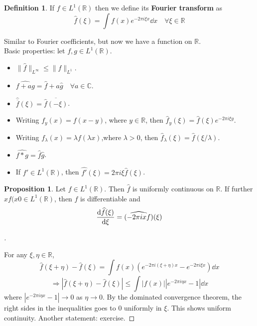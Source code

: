 \documentclass{article}
\theoremstyle{definition}
\newtheorem{dfn}{Definition}
\newtheorem{prop}{Proposition}
\newenvironment{proofs}[1][\proofname]{%
  \begin{proof}[#1]$ $\par\nobreak\ignorespaces
}{%
  \end{proof}
}
\newcommand{\CC}{\mathbb C}
\newcommand{\RR}{\mathbb R}
\newcommand{\Ra}{\Rightarrow}
\begin{document}
\begin{dfn}
	If $f \in L^1(\RR)$ then we define its \textbf{Fourier transform} as
	\[
		\widehat{f}(\xi) = \int f(x) e^{- 2 \pi i \xi x} \dd{x} \quad \forall \xi \in \RR
	\]
\end{dfn}

Similar to Fourier coefficients, but now we have a function on $\RR$.\\
Basic properties: let $f, g \in L^1(\RR)$.
\begin{itemize}
	\item $\|\widehat{f}\|_{L^\infty} \leq \|f\|_{L^1}$.	

	\item $\widehat{f + ag} = \widehat{f} + a \widehat{g} \quad \forall a \in \CC$.

	\item $\widehat{\overline{f}}(\xi) = \overline{\widehat{f}(- \xi)}$.

	\item Writing $f_y(x) = f(x - y)$, where $y \in \RR$, then $\widehat{f}_y (\xi) = \widehat{f}(\xi) e^{- 2 \pi i \xi y}$.

	\item Writing $f_\lambda(x) = \lambda f(\lambda x)$,where $\lambda > 0$, then $\widehat{f}_\lambda(\xi) = \widehat{f}(\xi/\lambda)$.

	\item $\widehat{f * g} = \widehat{f} \widehat{g}$.

	\item If $f' \in L^1(\RR)$, then $\widehat{f'}(\xi) = 2 \pi i \xi \widehat{f}(\xi)$.
\end{itemize}

\begin{prop}
	Let $f \in L^1(\RR)$.
	Then $\widehat{f}$ is uniformly continuous on $\RR$.
	If further $x f(x0 \in L^1(\RR)$, then $\widehat{f}$ is differentiable and 
	\[
		\dv{\widehat{f}(\xi)}{\xi} = \widehat{(- 2 \pi i x f)} (\xi)
	\]
\end{prop}

\begin{proofs}
	For any $\xi, \eta \in \RR$, 
	\[
		\widehat{f}(\xi + \eta) - \widehat{f}(\xi) = \int f(x) (e^{- 2 \pi i (\xi + \eta) x} - e^{- 2 \pi i \xi x}) \dd{x}
	\]
	\[
		\Ra |\widehat{f}(\xi + \eta) - \widehat{f}(\xi)| \leq \int |f(x)| |e^{- 2 \pi i \eta x} - 1| \dd{x} 
	\]
	where $|e^{- 2 \pi i \eta x} - 1| \to 0$ as $\eta \to 0$.
	By the dominated convergence theorem, the right sides in the inequalities goes to 0 uniformly in $\xi$.	
	This shows uniform continuity.
	Another statement: exercise.
\end{proofs}
\end{document}

